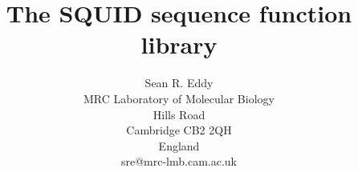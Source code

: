
\setcounter{secnumdepth}{0}


\addtolength{\oddsidemargin}{-.5in}
\addtolength{\textwidth}{1in}
\addtolength{\topmargin}{-.5in}
\addtolength{\textheight}{1in}
\renewcommand{\baselinestretch}{1.2}

\title{The SQUID sequence function library}

\author{Sean R. Eddy \\
MRC Laboratory of Molecular Biology\\
Hills Road\\
Cambridge CB2 2QH\\
England\\
sre@mrc-lmb.cam.ac.uk}



\nocite{TitlesOn}

\maketitle











